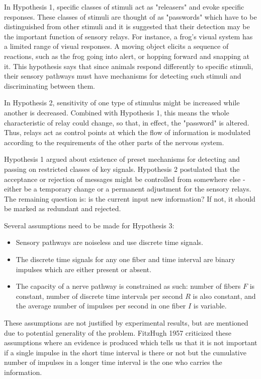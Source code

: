 \documentclass[twoside]{article}
\begin{document}
\begin{multicols}{2}
In Hypothesis 1, specific classes of stimuli act as "releasers" and evoke specific responses. These classes of stimuli are thought of as "passwords" which have to be distinguished from other stimuli and it is suggested that their detection may be the important function of sensory relays. For instance, a frog's visual system has a limited range of visual responses. A moving object elicits a sequence of reactions, such as the frog going into alert, or hopping forward and snapping at it. This hypothesis says that since animals respond differently to specific stimuli, their sensory pathways must have mechanisms for detecting such stimuli and discriminating between them. 

In Hypothesis 2, sensitivity of one type of stimulus might be increased while another is decreased. Combined with Hypothesis 1, this means the whole characteristic of relay could change, so that, in effect, the "password" is altered. Thus, relays act as control points at which the flow of information is modulated according to the requirements of the other parts of the nervous system.

Hypothesis 1 argued about existence of preset mechanisms for detecting and passing on restricted classes of key signals. Hypothesis 2 postulated that the acceptance or rejection of messages might be controlled from somewhere else - either be a temporary change or a permanent adjustment for the sensory relays. The remaining question is: is the current input new information? If not, it should be marked as redundant and rejected. 

Several assumptions need to be made for Hypothesis 3:
\begin{itemize}
	\item Sensory pathways are noiseless and use discrete time signals.
	\item The discrete time signals for any one fiber and time interval are binary impulses which are either present or absent.
	\item The capacity of a nerve pathway is constrained as such: number of fibers $F$ is constant, number of discrete time intervals per second $R$ is also constant, and the average number of impulses per second in one fiber $I$ is variable.
\end{itemize}

These assumptions are not justified by experimental results, but are mentioned due to potential generality of the problem. FitzHugh 1957 criticized these assumptions where an evidence is produced which tells us that it is not important if a single impulse in the short time interval is there or not but the cumulative number of impulses in a longer time interval is the one who carries the information. 


\end{multicols}
\end{document}
